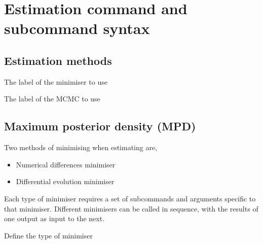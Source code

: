 \section{Estimation command and subcommand syntax\label{sec:estimation-syntax}}

\subsection{Estimation methods}



 {The label of the minimiser to use}

 {The label of the MCMC to use}

\subsection{Maximum posterior density (MPD)}

Two methods of minimising when estimating are, 
 
\begin{itemize}
	\item Numerical differences minimiser
  \item Differential evolution minimiser
\end{itemize}

Each type of minimiser requires a set of subcommands and arguments specific to that minimiser. Different minimisers can be called in sequence, with the results of one output as input to the next.


 {Define the type of minimiser}

\subsubsection[Numerical differences minimiser]{} 

